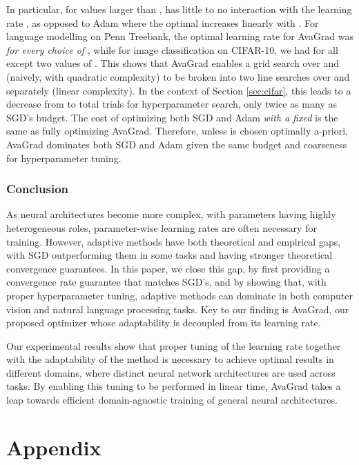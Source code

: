 \documentclass{article}
\newif\ifarxiv
\begin{document}
In particular, for values larger than ,  has little to no interaction with the
learning rate , as opposed to Adam where the optimal  increases
linearly with . For language modelling on Penn Treebank, the optimal
learning rate for AvaGrad was  \emph{for every choice of
}, while for image classification on CIFAR-10, we had 
for all except two values of .  This
shows that AvaGrad enables a grid search over  and  (naively, with
quadratic complexity) to be broken into two line searches over  and
 separately (linear complexity). In the context of Section \ref{sec:cifar}, this leads to a decrease from  to  total trials for hyperparameter search, only twice as many as SGD's budget. The cost of optimizing both SGD and Adam \emph{with a fixed } is the same as fully optimizing AvaGrad. Therefore, unless  is chosen optimally a-priori, AvaGrad dominates both SGD and Adam given the same budget and coarseness for hyperparameter tuning.




 \section{Conclusion}
\label{sec:conclusion}

As neural architectures become more complex, with parameters having highly
heterogeneous roles, parameter-wise learning rates are often necessary for
training.  However, adaptive methods have both theoretical and empirical gaps,
with SGD outperforming them in some tasks and having stronger theoretical convergence guarantees.  In this paper, we close
this gap, by first providing a convergence rate guarantee that matches SGD's, and by showing that, with proper hyperparameter tuning, adaptive methods can dominate in both computer vision and natural language processing tasks. Key to our finding is AvaGrad, our proposed optimizer whose adaptability is decoupled from its learning rate.

Our experimental results show that proper tuning of the learning rate together with the adaptability of the method is necessary to achieve optimal results in different domains, where distinct neural network architectures are used across tasks. By enabling this tuning to be performed in linear time, AvaGrad takes a leap towards efficient domain-agnostic training of general neural architectures. 

\ifarxiv
   
\else
   
\fi

\onecolumn
\newpage
\part*{Appendix}
\appendix
\end{document}
